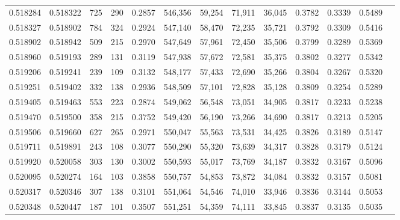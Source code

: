 \begin{tabular}{rrrrrrrrrrrrr}
0.518284 & 0.518322 &   725 &   290 &                                     0.2857 & 546,356 &  59,254 &  71,911 &  36,045 & 0.3782 & 0.3339 & 0.5489 \\
0.518327 & 0.518902 &   784 &   324 &                                     0.2924 & 547,140 &  58,470 &  72,235 &  35,721 & 0.3792 & 0.3309 & 0.5416 \\
0.518902 & 0.518942 &   509 &   215 &                                     0.2970 & 547,649 &  57,961 &  72,450 &  35,506 & 0.3799 & 0.3289 & 0.5369 \\
0.518960 & 0.519193 &   289 &   131 &                                     0.3119 & 547,938 &  57,672 &  72,581 &  35,375 & 0.3802 & 0.3277 & 0.5342 \\
0.519206 & 0.519241 &   239 &   109 &                                     0.3132 & 548,177 &  57,433 &  72,690 &  35,266 & 0.3804 & 0.3267 & 0.5320 \\
0.519251 & 0.519402 &   332 &   138 &                                     0.2936 & 548,509 &  57,101 &  72,828 &  35,128 & 0.3809 & 0.3254 & 0.5289 \\
0.519405 & 0.519463 &   553 &   223 &                                     0.2874 & 549,062 &  56,548 &  73,051 &  34,905 & 0.3817 & 0.3233 & 0.5238 \\
0.519470 & 0.519500 &   358 &   215 &                                     0.3752 & 549,420 &  56,190 &  73,266 &  34,690 & 0.3817 & 0.3213 & 0.5205 \\
0.519506 & 0.519660 &   627 &   265 &                                     0.2971 & 550,047 &  55,563 &  73,531 &  34,425 & 0.3826 & 0.3189 & 0.5147 \\
0.519711 & 0.519891 &   243 &   108 &                                     0.3077 & 550,290 &  55,320 &  73,639 &  34,317 & 0.3828 & 0.3179 & 0.5124 \\
0.519920 & 0.520058 &   303 &   130 &                                     0.3002 & 550,593 &  55,017 &  73,769 &  34,187 & 0.3832 & 0.3167 & 0.5096 \\
0.520095 & 0.520274 &   164 &   103 &                                     0.3858 & 550,757 &  54,853 &  73,872 &  34,084 & 0.3832 & 0.3157 & 0.5081 \\
0.520317 & 0.520346 &   307 &   138 &                                     0.3101 & 551,064 &  54,546 &  74,010 &  33,946 & 0.3836 & 0.3144 & 0.5053 \\
0.520348 & 0.520447 &   187 &   101 &                                     0.3507 & 551,251 &  54,359 &  74,111 &  33,845 & 0.3837 & 0.3135 & 0.5035 \\

\end{tabular}
